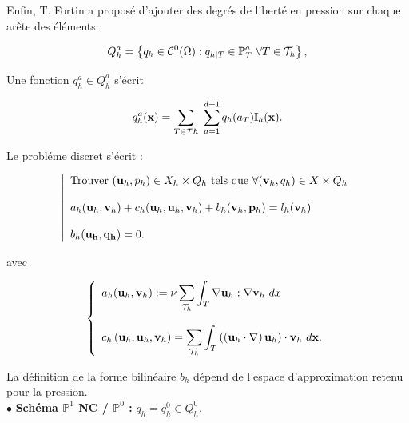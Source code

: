 \begin{appendix}
Enfin, T. Fortin \cite{Fortin} a propos\'e d'ajouter des degr\'es de libert\'e en pression sur chaque ar\^ete des \'el\'ements :


\begin{equation}
\ds{
Q_h^a = \left\lbrace q_h\in \mathcal C ^0(\Omega): q_{h|T} \in \mathbb P_T^a\ \forall T\in \mathcal T _h\right\rbrace,
}
\end{equation}


Une fonction $q_h^a\in Q_h^a$ s'\'ecrit 

\begin{equation}
\ds{q_h^a(\mbf x)=\sum _{T\in \mathcal T h}\ \sum _{a=1}^{d+1} q_h(a_T)\mathbb I _a (\mbf x) }.
\end{equation}




Le probl\'eme discret s'\'ecrit : 

\begin{equation}
\left\lvert
\label{pb-VEF-P0}
\begin{array}{l}
\ds{ \text{Trouver } (\mbf{u}_h,p_h)\in X_h\times Q_h  \text{ tels que}\ \forall (\mbf{v}_h,q_h)\in X\times Q_h }\\
\\
\ds{a_h(\mbf{u}_h, \mbf{v}_h)+c_h(\mbf{u}_h, \mbf{u}_h, \mbf{v}_h) + b_h( \mbf{v}_h, \mbf{p}_h)=l_h(\mbf{v}_h) }\\
\\
\ds{b_h(\mbf{u_h},\mbf{q_h}) =0.}
\end{array}
\right.
\end{equation}



avec

\begin{equation}
\left\lbrace
\begin{array}{l}
\ds{
a_h(\mbf{u}_h, \mbf{v}_h):= \nu \sum _{\mathcal T _h}\int _{T}\nabla \mbf{u}_h: \nabla \mbf{v}_h\ dx
}\\
\\
\ds{
c_h \left(  \mbf{u}_h, \mbf{u}_h, \mbf{v}_h \right) = \sum _{\mathcal T _h}\int _{T}
  \left(  \left( \mbf{u}_h\cdot \nabla \right) \mbf{u}_h \right) \cdot \mbf{v}_h
  \ d\mbf x.}
\end{array}
\right.
\end{equation}

La d\'efinition de la forme bilin\'eaire $b_h$ d\'epend de l'espace d'approximation retenu pour la pression.\\

$ \bullet $ {\bf{ Schéma $\mathbb P^1$ NC / $\mathbb P^0 $ :}} $q_h=q_h^0\in Q_h^0.$\\


\end{appendix}
